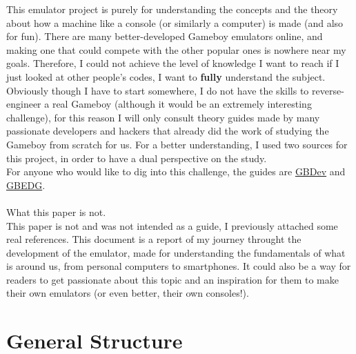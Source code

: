 \documentclass{article}
\begin{document}
This emulator project is purely for understanding the concepts and the theory about how a machine like a console (or similarly a computer) is made (and also for fun). There are many better-developed Gameboy emulators online, and making one that could compete with the other popular ones is nowhere near my goals. Therefore, I could not achieve the level of knowledge I want to reach if I just looked at other people's codes, I want to \textbf{fully} understand the subject. Obviously though I have to start somewhere, I do not have the skills to reverse-engineer a real Gameboy (although it would be an extremely interesting challenge), for this reason I will only consult theory guides made by many passionate developers and hackers that already did the work of studying the Gameboy from scratch for us. For a better understanding, I used two sources for this project, in order to have a dual perspective on the study.\\
For anyone who would like to dig into this challenge, the guides are
\href{https://gbdev.io/}{GBDev}  and
\href{https://hacktix.github.io/GBEDG/}{GBEDG}. \\
\\
What this paper is not. \\
This paper is not and was not intended as a guide, I previously attached some real references. This document is a report of my journey throught the development of the emulator, made for understanding the fundamentals of what is around us, from personal computers to smartphones. It could also be a way for readers to get passionate about this topic and an inspiration for them to make their own emulators (or even better, their own consoles!).
\newpage
\section{General Structure}\label{sec:general-structure}
\end{document}
